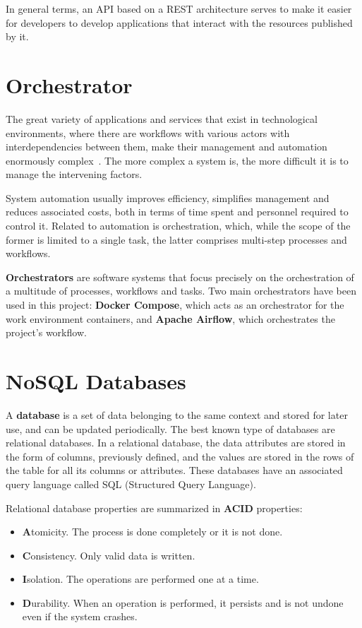 \nonzeroparskip In general terms, an API based on a REST architecture serves to make it easier for developers to develop applications that interact with the resources published by it.

\section{Orchestrator}

\nonzeroparskip The great variety of applications and services that exist in technological environments, where there are workflows with various actors with interdependencies between them, make their management and automation enormously complex~\cite{redhat_orchestrator}. The more complex a system is, the more difficult it is to manage the intervening factors.

\nonzeroparskip System automation usually improves efficiency, simplifies management and reduces associated costs, both in terms of time spent and personnel required to control it. Related to automation is orchestration, which, while the scope of the former is limited to a single task, the latter comprises multi-step processes and workflows.

\nonzeroparskip \textbf{Orchestrators} are software systems that focus precisely on the orchestration of a multitude of processes, workflows and tasks. Two main orchestrators have been used in this project: \textbf{Docker Compose}, which acts as an orchestrator for the work environment containers, and \textbf{Apache Airflow}, which orchestrates the project's workflow.

\section{NoSQL Databases}

\nonzeroparskip A \textbf{database} is a set of data belonging to the same context and stored for later use, and can be updated periodically. The best known type of databases are relational databases. In a relational database, the data attributes are stored in the form of columns, previously defined, and the values are stored in the rows of the table for all its columns or attributes. These databases have an associated query language called SQL (Structured Query Language).

\nonzeroparskip Relational database properties are summarized in \textbf{ACID} properties:
\begin{itemize}
	\item \textbf{A}tomicity. The process is done completely or it is not done.
	\item \textbf{C}onsistency. Only valid data is written.
	\item \textbf{I}solation. The operations are performed one at a time.
	\item \textbf{D}urability. When an operation is performed, it persists and is not undone even if the system crashes.
\end{itemize}

